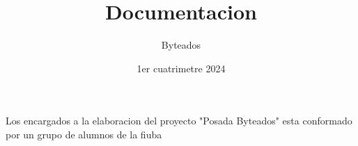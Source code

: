 \documentclass[12pt, letter paper]{article}
\title{Documentacion}
\author{Byteados}
\date{1er cuatrimetre 2024}
\begin{document}
\maketitle

\tableofcontents















Los encargados a la elaboracion del proyecto "Posada Byteados" esta conformado por un grupo de alumnos de la fiuba 
\end{document}
